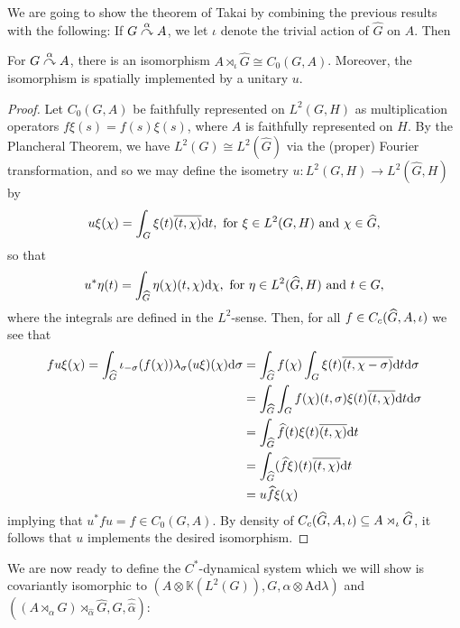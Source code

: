 We are going to show the theorem of Takai by combining the previous results with the following: If $G \stackrel{\alpha}{\curvearrowright} A$, we let $\iota$ denote the trivial action of $\hat G$ on $A$. Then
\begin{lemma}
	For $G \stackrel{\alpha}{\curvearrowright} A$, there is an isomorphism $A \rtimes_\iota \hat G \cong C_0(G,A)$. Moreover, the isomorphism is spatially implemented by a unitary $u$.
	\label{takai:trivcrossiso}
\end{lemma}
\begin{proof}
	Let $C_0(G,A)$ be faithfully represented on $L^2(G,H)$ as multiplication operators $f \xi(s) = f(s) \xi(s)$, where $A$ is faithfully represented on $H$. By the Plancheral Theorem, we have $L^2(G) \cong L^2(\hat G)$ via the (proper) Fourier transformation, and so we may define the isometry $u \colon L^2(G,H) \to L^2(\hat G,H)$ by
	\begin{align*}
		u \xi(\chi) = \int_G \xi(t) \overline{(t, \chi)} \mathrm{d} t, \text{ for } \xi \in L^2(G,H) \text{ and } \chi \in \widehat{G},
	\end{align*}
	so that 
	\begin{align*}
		u^* \eta (t) = \int_{\widehat{G}} \eta(\chi) (t, \chi) \mathrm{d} \chi, \text{ for } \eta \in L^2(\widehat{G},H) \text{ and } t \in G,
	\end{align*}
	where the integrals are defined in the $L^2$-sense. Then, for all $f \in C_c(\widehat{G}, A,\iota)$ we see that
	\begin{align*}
		f u \xi(\chi) = \int_{\widehat{G}} \iota_{-\sigma}(f(\chi)) \lambda_\sigma (u \xi)(\chi) \mathrm{d} \sigma &= \int_{\widehat{G}} f(\chi) \int_G \xi(t) \overline{(t,\chi - \sigma)} \mathrm{d} t \mathrm{d} \sigma\\
		&= \int_{\widehat{G}}\int_G f(\chi)(t, \sigma) \xi(t) \overline{(t, \chi)} \mathrm{d} t \mathrm{d} \sigma\\
		&= \int_{\widehat{G}} \widehat{f}(t) \xi(t) \overline{(t, \chi)} \mathrm{d} t\\
		&= \int_{\widehat{G}} (\widehat{f} \xi)(t) \overline{(t, \chi)} \mathrm{d} t\\
		&= u \widehat{f} \xi(\chi)
	\end{align*}
	implying that $u^* f u = \hat f \in C_0(G, A)$. By density of $C_c(\widehat{G}, A, \iota) \subseteq A \rtimes_\iota \widehat{G}$, it follows that $u$ implements the desired isomorphism.
\end{proof}
We are now ready to define the $C^*$-dynamical system which we will show is covariantly isomorphic to $(A \otimes \mathbb{K}(L^2(G)), G, \alpha \otimes \mathrm{Ad} \lambda)$ and $\left( (A \rtimes_\alpha G)\rtimes_{\hat \alpha} \hat G, G, \hat{\hat \alpha} \right)$:
